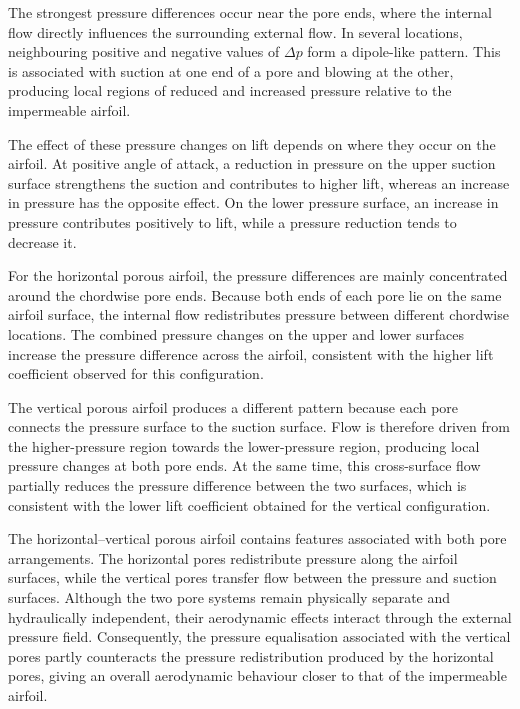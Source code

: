 \documentclass[a4paper,fleqn]{cas-dc}
\begin{document}
	The strongest pressure differences occur near the pore ends, where the
	internal flow directly influences the surrounding external flow. In
	several locations, neighbouring positive and negative values of
	$\Delta p$ form a dipole-like pattern. This is associated with suction
	at one end of a pore and blowing at the other, producing local regions
	of reduced and increased pressure relative to the impermeable airfoil.
	
	The effect of these pressure changes on lift depends on where they occur
	on the airfoil. At positive angle of attack, a reduction in pressure on
	the upper suction surface strengthens the suction and contributes to
	higher lift, whereas an increase in pressure has the opposite effect.
	On the lower pressure surface, an increase in pressure contributes
	positively to lift, while a pressure reduction tends to decrease it.
	
	For the horizontal porous airfoil, the pressure differences are mainly
	concentrated around the chordwise pore ends. Because both ends of each
	pore lie on the same airfoil surface, the internal flow redistributes
	pressure between different chordwise locations. The combined pressure
	changes on the upper and lower surfaces increase the pressure difference
	across the airfoil, consistent with the higher lift coefficient observed
	for this configuration.
	
	The vertical porous airfoil produces a different pattern because each
	pore connects the pressure surface to the suction surface. Flow is
	therefore driven from the higher-pressure region towards the
	lower-pressure region, producing local pressure changes at both pore
	ends. At the same time, this cross-surface flow partially reduces the
	pressure difference between the two surfaces, which is consistent with
	the lower lift coefficient obtained for the vertical configuration.
	
	The horizontal--vertical porous airfoil contains features associated
	with both pore arrangements. The horizontal pores redistribute pressure
	along the airfoil surfaces, while the vertical pores transfer flow
	between the pressure and suction surfaces. Although the two pore systems
	remain physically separate and hydraulically independent, their
	aerodynamic effects interact through the external pressure field.
	Consequently, the pressure equalisation associated with the vertical
	pores partly counteracts the pressure redistribution produced by the
	horizontal pores, giving an overall aerodynamic behaviour closer to
	that of the impermeable airfoil.
	
\end{document}
